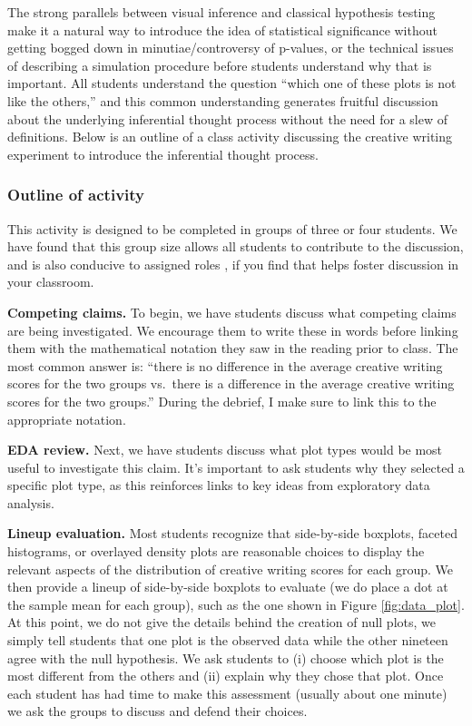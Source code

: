 \documentclass[12pt]{article}
\begin{document}
The strong parallels between visual inference and classical hypothesis
testing make it a natural way to introduce the idea of statistical
significance without getting bogged down in minutiae/controversy of
p-values, or the technical issues of describing a simulation procedure
before students understand why that is important. All students
understand the question ``which one of these plots is not like the
others,'' and this common understanding generates fruitful discussion
about the underlying inferential thought process without the need for a
slew of definitions. Below is an outline of a class activity discussing
the creative writing experiment to introduce the inferential thought
process.

\hypertarget{outline-of-activity}{%
\subsubsection{Outline of activity}\label{outline-of-activity}}

This activity is designed to be completed in groups of three or four
students. We have found that this group size allows all students to
contribute to the discussion, and is also conducive to assigned roles
\citep{Roseth2008-xx}, if you find that helps foster discussion in your
classroom.

\textbf{Competing claims.} To begin, we have students discuss what
competing claims are being investigated. We encourage them to write
these in words before linking them with the mathematical notation they
saw in the reading prior to class. The most common answer is: ``there is
no difference in the average creative writing scores for the two groups
vs.~there is a difference in the average creative writing scores for the
two groups.'' During the debrief, I make sure to link this to the
appropriate notation.

\textbf{EDA review.} Next, we have students discuss what plot types
would be most useful to investigate this claim. It's important to ask
students why they selected a specific plot type, as this reinforces
links to key ideas from exploratory data analysis.

\textbf{Lineup evaluation.} Most students recognize that side-by-side
boxplots, faceted histograms, or overlayed density plots are reasonable
choices to display the relevant aspects of the distribution of creative
writing scores for each group. We then provide a lineup of side-by-side
boxplots to evaluate (we do place a dot at the sample mean for each
group), such as the one shown in Figure \ref{fig:data_plot}. At this
point, we do not give the details behind the creation of null plots, we
simply tell students that one plot is the observed data while the other
nineteen agree with the null hypothesis. We ask students to (i) choose
which plot is the most different from the others and (ii) explain why
they chose that plot. Once each student has had time to make this
assessment (usually about one minute) we ask the groups to discuss and
defend their choices.
\end{document}
